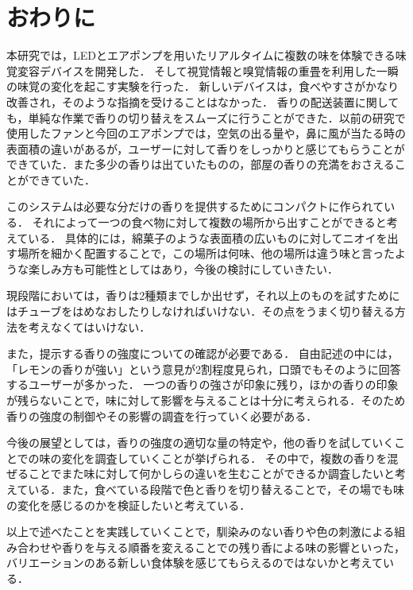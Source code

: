 
\section{おわりに}


本研究では，LEDとエアポンプを用いたリアルタイムに複数の味を体験できる味覚変容デバイスを開発した．
そして視覚情報と嗅覚情報の重畳を利用した一瞬の味覚の変化を起こす実験を行った．
新しいデバイスは，食べやすさがかなり改善され，そのような指摘を受けることはなかった．
香りの配送装置に関しても，単純な作業で香りの切り替えをスムーズに行うことができた．以前の研究で使用したファンと今回のエアポンプでは，空気の出る量や，鼻に風が当たる時の表面積の違いがあるが，ユーザーに対して香りをしっかりと感じてもらうことができていた．また多少の香りは出ていたものの，部屋の香りの充満をおさえることができていた．


このシステムは必要な分だけの香りを提供するためにコンパクトに作られている．
それによって一つの食べ物に対して複数の場所から出すことができると考えている．
具体的には，綿菓子のような表面積の広いものに対してニオイを出す場所を細かく配置することで，この場所は何味、他の場所は違う味と言ったような楽しみ方も可能性としてはあり，今後の検討にしていきたい．

現段階においては，香りは2種類までしか出せず，それ以上のものを試すためにはチューブをはめなおしたりしなければいけない．その点をうまく切り替える方法を考えなくてはいけない．

また，提示する香りの強度についての確認が必要である．
自由記述の中には，「レモンの香りが強い」という意見が2割程度見られ，口頭でもそのように回答するユーザーが多かった．
一つの香りの強さが印象に残り，ほかの香りの印象が残らないことで，味に対して影響を与えることは十分に考えられる．そのため香りの強度の制御やその影響の調査を行っていく必要がある．

今後の展望としては，香りの強度の適切な量の特定や，他の香りを試していくことでの味の変化を調査していくことが挙げられる．
その中で，複数の香りを混ぜることでまた味に対して何かしらの違いを生むことができるか調査したいと考えている．また，食べている段階で色と香りを切り替えることで，その場でも味の変化を感じるのかを検証したいと考えている．

以上で述べたことを実践していくことで，馴染みのない香りや色の刺激による組み合わせや香りを与える順番を変えることでの残り香による味の影響といった，バリエーションのある新しい食体験を感じてもらえるのではないかと考えている．




